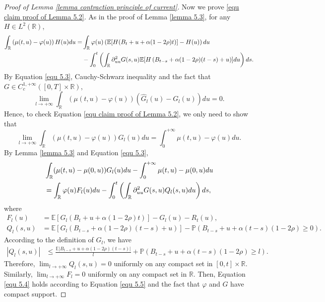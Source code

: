 \documentclass[10pt,a4paper]{amsart}
\newcommand{\R}{\mathbb{R}}
\begin{document}
\begin{proof}[Proof of Lemma \ref{lemma contraction principle of current}]
	Now we prove \eqref{equ claim proof of Lemma 5.2}.  
	As in the proof of Lemma \ref{lemma 5.3}, for any $H\in L^2(\R)$, 
	\begin{align}\label{equ 5.3}
		\int_{\R}\left(\mu(t,u)-\varphi (u)\right)H(u)du=&\int_{\R}\varphi (u)\left(\mathbb{E}[H(B_t+u+\alpha(1-2\rho)t)]-H(u)\right)du \\
		&-\int_0^t\left(\int_{\R}\partial_{uu}^2G (s,u)\mathbb{E}[H\left(B_{t-s}+\alpha(1-2\rho)(t-s)+u\right)] du\right)ds\notag. 
	\end{align}
	By Equation \eqref{equ 5.3}, Cauchy-Schwarz inequality and the fact that $G \in C_c^{1,+\infty}([0, T]\times \R)$, 
	\[
	\lim_{l\rightarrow+\infty}\int_{\R}(\mu(t, u)- \varphi (u))(\hat{G}_l(u)-G_l(u))du=0. 
	\]
	Hence, to check Equation \eqref{equ claim proof of Lemma 5.2}, we only need to show that
	\begin{equation}\label{equ 5.4}
		\lim_{l\rightarrow+\infty}\int_{\R}(\mu(t, u)-\varphi (u)) G_l (u)du=\int_0^{+\infty}\mu(t, u)-\varphi (u) du.
	\end{equation}
	By Lemma \ref{lemma 5.3} and Equation \eqref{equ 5.3},
	\begin{align}\label{equ 5.5}
		&\int_{\R}(\mu(t, u)-\mu(0,u))G_l(u)du-\int_0^{+\infty}\mu(t, u)-\mu(0,u)du \notag\\
		&=\int_{\R} \varphi (u) F_l(u)du-\int_0^t\left(\int_{\R}\partial_{uu}^2 G (s,u)Q_l(s,u)du\right)ds,
	\end{align}
	where
	\begin{align*}
		F_l(u) &=\mathbb{E}[G_l(B_t+u+\alpha(1-2\rho)t)]-G_l(u)-R_t(u),\\
		Q_l(s,u)&=\mathbb{E}[G_l\left(B_{t-s}+\alpha(1-2\rho)(t-s)+u\right)]-\mathbb{P}(B_{t-s}+u+\alpha(t-s)(1-2\rho)\geq 0).
	\end{align*}
	According to the definition of $G_l$, we have
	\begin{align*}
		|Q_l(s,u)|&\leq \frac{\mathbb{E}|B_{t-s}+u+\alpha(1-2\rho)(t-s)|}{l}+\mathbb{P}\left(B_{t-s}+u+\alpha(t-s)(1-2\rho)\geq l\right).  
	\end{align*}
	Therefore, $\lim_{l\rightarrow+\infty}Q_l (s,u)=0$ uniformly on any compact set in $ [0, t]\times \R$. Similarly, $\lim_{l\rightarrow+\infty}F_l=0$ uniformly on any compact set in $\R$. Then, Equation \eqref{equ 5.4} holds according to Equation \eqref{equ 5.5} and the fact that $\varphi$ and $G$ have compact support. 
	

\end{proof}
\end{document}
